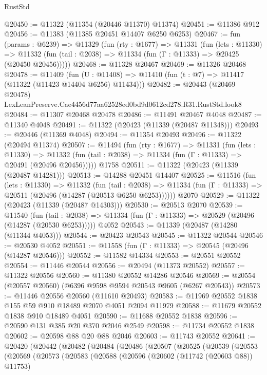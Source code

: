 \begin{lexlean}{RustStd}
\begin{coremodule}
@20450 := @11322 (@11354 (@20446 @11370) @11374)
@20451 := @11386 @912
@20456 := @11383 (@11385 @20451 @14407 @6250 @6253)
@20467 := fun (params : @6239) =>
  @11329
    (fun (rty : @1677) =>
    @11331
      (fun (lets : @11330) =>
      @11332 (fun (tail : @2038) => @11334 (fun (Γ : @11333) => @20425 (@20450 @20456)))))
@20468 := @11328 @20467
@20469 := @11326 @20468
@20478 := @11409
    (fun (U : @11408) => @11410 (fun (t : @7) => @11417 (@11322 (@11423 @14404 @6256) @11434)))
@20482 := @20443 (@20469 @20478) LexLeanPreserve.Cae4456d77aa62528ed0bd9d0612cd278.R31.RustStd.look8
@20484 := @11307 @20468 @20478
@20486 := @11491 @20467 @4048
@20487 := @11340 @4048
@20491 := @11322 (@20423 (@11339 (@20487 @11348)))
@20493 := @20446 (@11369 @4048)
@20494 := @11354 @20493
@20496 := @11322 (@20494 @11374)
@20507 := @11494
    (fun (rty : @1677) =>
    @11331
      (fun (lets : @11330) =>
      @11332 (fun (tail : @2038) => @11334 (fun (Γ : @11333) => @20491 (@20496 @20456)))))
    @1758
@20511 := @11322 (@20423 (@11339 (@20487 @14281)))
@20513 := @14288 @20451 @14407
@20525 := @11516
    (fun (lets : @11330) =>
    @11332
      (fun (tail : @2038) =>
      @11334 (fun (Γ : @11333) => @20511 (@20496 (@14287 (@20513 @6250 @6253))))))
    @2070
@20529 := @11322 (@20423 (@11339 (@20487 @14303)))
@20530 := @20513 @2070
@20539 := @11540
    (fun (tail : @2038) => @11334 (fun (Γ : @11333) => @20529 (@20496 (@14287 (@20530 @6253)))))
    @4052
@20543 := @11339 (@20487 (@14280 (@11344 @4053)))
@20544 := @20423 @20543
@20545 := @11322 @20544
@20546 := @20530 @4052
@20551 := @11558 (fun (Γ : @11333) => @20545 (@20496 (@14287 @20546)))
@20552 := @11582 @14334
@20553 := @20551 @20552
@20554 := @11446 @20544
@20556 := @20494 (@11373 @20552)
@20557 := @11322 @20556
@20560 := @11380 @20552 @14286 @20546
@20569 := @20554 (@20557 @20560) (@6396 @9598 @9594 @20543 @9605 (@6267 @20543))
@20573 := @11446 @20556 @20560 (@11610 @20493)
@20583 := @11969 @20552 @1838 @155 @59 @910 @18489 @2070 @4051 @2094 @11979
@20588 := @11679 @20552 @1838 @910 @18489 @4051
@20590 := @11688 @20552 @1838
@20596 := @20590 @131 @385 @20 @370 @2046 @2549
@20598 := @11734 @20552 @1838
@20602 := @20598 @88 @20 @88 @2046
@20603 := @11743 @20552
@20641 := @20420
    (@20442
      (@20482
        (@20484
          (@20486
            (@20507
              (@20525
                (@20539
                  (@20553
                    (@20569
                      (@20573
                        (@20583
                          (@20588
                            (@20596
                              (@20602 (@11742 (@20603 @88)) @11753)

\end{coremodule}
\end{lexlean}
